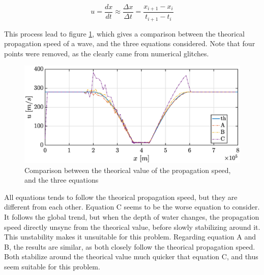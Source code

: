 \documentclass[a4paper,12pt,twoside]{article}
\begin{document}
        \begin{equation}
          u=\frac{dx}{dt}\approx\frac{\Delta x}{\Delta t}=\frac{x_{i+1} - x_i}{t_{i+1} - t_i}
          \label{eq:DFM-u}
        \end{equation}

        This process lead to figure \ref{fig:tsunami_speed}, which gives a comparison between the theorical propagation speed of a wave, and the three equations considered.
        Note that four points were removed, as the clearly came from numerical glitches.

        \begin{figure}[h]
          \centering
          \includegraphics[width=\textwidth]{graphs/tsunami_speed.eps}
          \caption{Comparison between the theorical value of the propagation speed, and the three equations}
          \label{fig:tsunami_speed}
        \end{figure}

        All equations tends to follow the theorical propagation speed, but they are different from each other.
        Equation C seems to be the worse equation to consider.
        It follows the global trend, but when the depth of water changes, the propagation speed directly unsync from the theorical value, before slowly stabilizing around it.
        This unstability makes it unsuitable for this problem.
        Regarding equation A and B, the results are similar, as both closely follow the theorical propagation speed.
        Both stabilize around the theorical value much quicker that equation C, and thus seem suitable for this problem.

\end{document}
